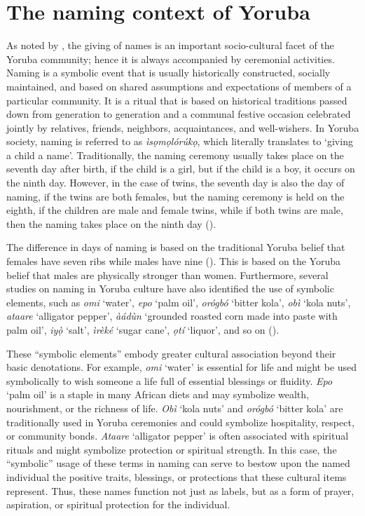 \documentclass[output=paper,colorlinks,citecolor=brown]{langscibook}
\begin{document}
\section{The naming context of Yoruba} \label{SEC2-NamingContext}

As noted by \citet{Ehineni2019}, the giving of names is an important socio-cultural facet of the Yoruba community; hence it is always accompanied by ceremonial activities. Naming is a symbolic event that is usually historically constructed, socially maintained, and based on shared assumptions and expectations of members of a particular community. It is a ritual that is based on historical traditions passed down from generation to generation and a communal festive occasion celebrated jointly by relatives, friends, neighbors, acquaintances, and well-wishers. In Yoruba society, naming is referred to as \textit{ìsọmọlórúkọ}, which literally translates to ‘giving a child a name’. Traditionally, the naming ceremony usually takes place on the seventh day after birth, if the child is a girl, but if the child is a boy, it occurs on the ninth day. However, in the case of twins, the seventh day is also the day of naming, if the twins are both females, but the naming ceremony is held on the eighth, if the children are male and female twins, while if both twins are male, then the naming takes place on the ninth day (\cite{Ilésanmí1987}). 

The difference in days of naming is based on the traditional Yoruba belief that females have seven ribs while males have nine (\cite{Akinnaso1980}). This is based on the Yoruba belief that males are physically stronger than women. Furthermore, several studies on naming in Yoruba culture have also identified the use of symbolic elements, such as \textit{omi} ‘water’, \textit{epo} ‘palm oil’, \textit{orógbó} ‘bitter kola’,  \textit{obì} ‘kola nuts’, \textit{ataare} ‘alligator pepper’,  \textit{àádùn} ‘grounded roasted corn made into paste with palm oil’, \textit{iyọ̀} ‘salt’, \textit{ìrèké} ‘sugar cane’, \textit{ọtí }‘liquor’, and so on (\citealt{Adeoye1979, DaramolaJeje1967, Ilésanmí1987, Ladeleetal1986, Ogunbowale1979}). 

These ``symbolic elements'' embody greater cultural association beyond their basic denotations. For example, \textit{omi} `water' is essential for life and might be used symbolically to wish someone a life full of essential blessings or fluidity. \textit{Epo} `palm oil' is a staple in many African diets and may symbolize wealth, nourishment, or the richness of life. \textit{Obì} `kola nuts' and \textit{orógbó} `bitter kola' are traditionally used in Yoruba ceremonies and could symbolize hospitality, respect, or community bonds. \textit{Ataare} `alligator pepper' is often associated with spiritual rituals and might symbolize protection or spiritual strength. In this case, the ``symbolic'' usage of these terms in naming can serve to bestow upon the named individual the positive traits, blessings, or protections that these cultural items represent. Thus, these names function not just as labels, but as a form of prayer, aspiration, or spiritual protection for the individual. 
\end{document}
